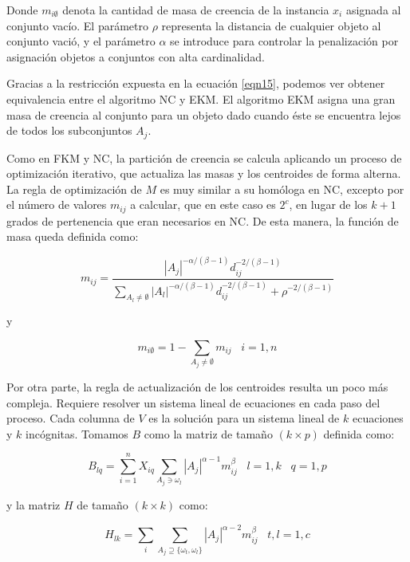 Donde $m_{i\emptyset}$ denota la cantidad de masa de creencia de la instancia $x_i$ asignada al conjunto vacío. El parámetro $\rho$ representa la distancia de cualquier objeto al conjunto vació, y el parámetro $\alpha$ se introduce para controlar la penalización por asignación objetos a conjuntos con alta cardinalidad.

Gracias a la restricción expuesta en la ecuación \ref{eqn15}, podemos ver obtener equivalencia entre el algoritmo NC y EKM. El algoritmo EKM asigna una gran masa de creencia al conjunto para un objeto dado cuando éste se encuentra lejos de todos los subconjuntos $A_j$.

Como en FKM y NC, la partición de creencia se calcula aplicando un proceso de optimización iterativo, que actualiza las masas  y los centroides de forma alterna. La regla de optimización de $M$ es muy similar a su homóloga en NC, excepto por el número de valores $m_{ij}$ a calcular, que en este caso es $2^c$, en lugar de los $k + 1$ grados de pertenencia que eran necesarios en NC. De esta manera, la función de masa queda definida como:

 \begin{equation}
m_{ij} = \frac{|A_j|^{-\alpha/(\beta-1)} d_{ij}^{-2/(\beta-1)}}{\sum_{A_l \ne \emptyset}|A_l|^{-\alpha/(\beta-1)} d_{ij}^{-2/(\beta-1)} + \rho^{-2/(\beta-1)}}
 \label{eqn16}
 \end{equation}
 
 y
 
\begin{equation}
m_{i\emptyset} = 1 - \sum_{A_j \ne \emptyset}m_{ij} \;\;\; i = 1,n
\label{eqn17}
\end{equation}

Por otra parte, la regla de actualización de los centroides resulta un poco más compleja. Requiere resolver un sistema lineal de ecuaciones en cada paso del proceso. Cada columna de $V$ es la solución para un sistema lineal de $k$ ecuaciones y $k$ incógnitas. Tomamos $B$ como la matriz de tamaño $(k \times p)$ definida como:

\begin{equation}
B_{lq} = \sum_{i=1}^{n} X_{iq} \sum_{A_j \ni \omega_l} |A_j|^{\alpha-1} m_{ij}^\beta \;\;\; l = 1,k \;\;\; q =1,p
\label{eqn18}
\end{equation}

y la matriz $H$ de tamaño $(k \times k)$ como:

\begin{equation}
H_{lk} = \sum_{i} \sum_{A_j \supseteq \{\omega_t,\omega_l\}} |A_j|^{\alpha - 2} m_{ij}^\beta \;\;\; t,l = 1,c 
\label{eqn20}
\end{equation}

